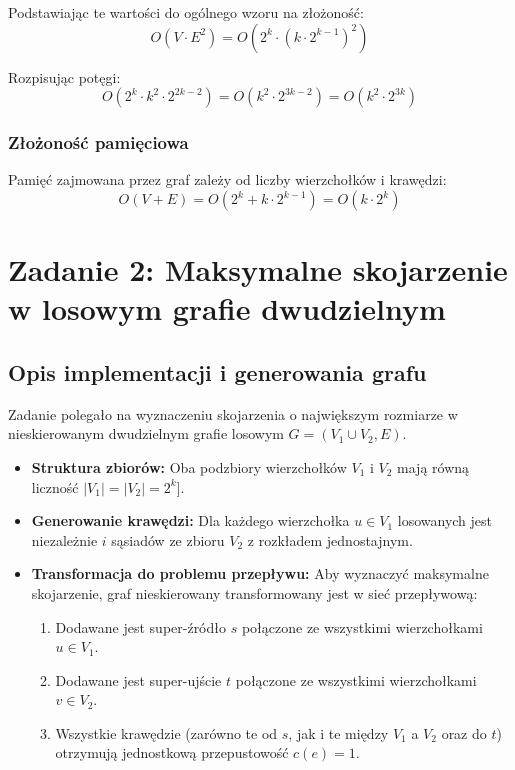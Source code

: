 \documentclass[11pt, a4paper]{article}
\begin{document}
	Podstawiając te wartości do ogólnego wzoru na złożoność:
	\begin{equation}
		O(V \cdot E^2) = O(2^k \cdot (k \cdot 2^{k-1})^2)
	\end{equation}
	
	Rozpisując potęgi:
	\begin{equation}
		O(2^k \cdot k^2 \cdot 2^{2k-2}) = O(k^2 \cdot 2^{3k-2}) = O(k^2 \cdot 2^{3k})
	\end{equation}
	
	\subsubsection{Złożoność pamięciowa}
	Pamięć zajmowana przez graf zależy od liczby wierzchołków i krawędzi:
	\begin{equation}
		O(V + E) = O(2^k + k \cdot 2^{k-1}) = O(k \cdot 2^k)
	\end{equation}
	
	\section{Zadanie 2: Maksymalne skojarzenie w losowym grafie dwudzielnym}
	
	\subsection{Opis implementacji i generowania grafu}
	Zadanie polegało na wyznaczeniu skojarzenia o największym rozmiarze w nieskierowanym dwudzielnym grafie losowym $G = (V_1 \cup V_2, E)$.
	\begin{itemize}
		\item \textbf{Struktura zbiorów:} Oba podzbiory wierzchołków $V_1$ i $V_2$ mają równą liczność $|V_1| = |V_2| = 2^k$].
		\item \textbf{Generowanie krawędzi:} Dla każdego wierzchołka $u \in V_1$ losowanych jest niezależnie $i$ sąsiadów ze zbioru $V_2$ z rozkładem jednostajnym. 
		\item \textbf{Transformacja do problemu przepływu:} Aby wyznaczyć maksymalne skojarzenie, graf nieskierowany transformowany jest w sieć przepływową:
		\begin{enumerate}
			\item Dodawane jest super-źródło $s$ połączone ze wszystkimi wierzchołkami $u \in V_1$.
			\item Dodawane jest super-ujście $t$ połączone ze wszystkimi wierzchołkami $v \in V_2$.
			\item Wszystkie krawędzie (zarówno te od $s$, jak i te między $V_1$ a $V_2$ oraz do $t$) otrzymują jednostkową przepustowość $c(e) = 1$.
		\end{enumerate}
	\end{itemize}
	
\end{document}
